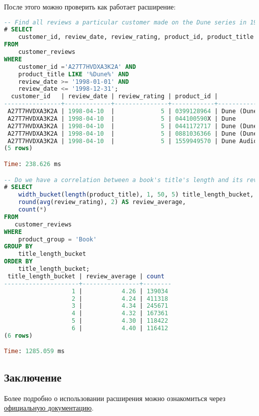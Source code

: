 После этого можно проверить как работает расширение:

\begin{lstlisting}[language=SQL,label=lst:cstore5,caption=Cstore запросы]
-- Find all reviews a particular customer made on the Dune series in 1998.
# SELECT
    customer_id, review_date, review_rating, product_id, product_title
FROM
    customer_reviews
WHERE
    customer_id ='A27T7HVDXA3K2A' AND
    product_title LIKE '%Dune%' AND
    review_date >= '1998-01-01' AND
    review_date <= '1998-12-31';
  customer_id   | review_date | review_rating | product_id |                 product_title
----------------+-------------+---------------+------------+-----------------------------------------------
 A27T7HVDXA3K2A | 1998-04-10  |             5 | 0399128964 | Dune (Dune Chronicles (Econo-Clad Hardcover))
 A27T7HVDXA3K2A | 1998-04-10  |             5 | 044100590X | Dune
 A27T7HVDXA3K2A | 1998-04-10  |             5 | 0441172717 | Dune (Dune Chronicles, Book 1)
 A27T7HVDXA3K2A | 1998-04-10  |             5 | 0881036366 | Dune (Dune Chronicles (Econo-Clad Hardcover))
 A27T7HVDXA3K2A | 1998-04-10  |             5 | 1559949570 | Dune Audio Collection
(5 rows)

Time: 238.626 ms

-- Do we have a correlation between a book's title's length and its review ratings?
# SELECT
    width_bucket(length(product_title), 1, 50, 5) title_length_bucket,
    round(avg(review_rating), 2) AS review_average,
    count(*)
FROM
   customer_reviews
WHERE
    product_group = 'Book'
GROUP BY
    title_length_bucket
ORDER BY
    title_length_bucket;
 title_length_bucket | review_average | count
---------------------+----------------+--------
                   1 |           4.26 | 139034
                   2 |           4.24 | 411318
                   3 |           4.34 | 245671
                   4 |           4.32 | 167361
                   5 |           4.30 | 118422
                   6 |           4.40 | 116412
(6 rows)

Time: 1285.059 ms
\end{lstlisting}


\subsection{Заключение}

Более подробно о использовании расширения можно ознакомиться через \href{https://citusdata.github.io/cstore_fdw/}{официальную документацию}.
